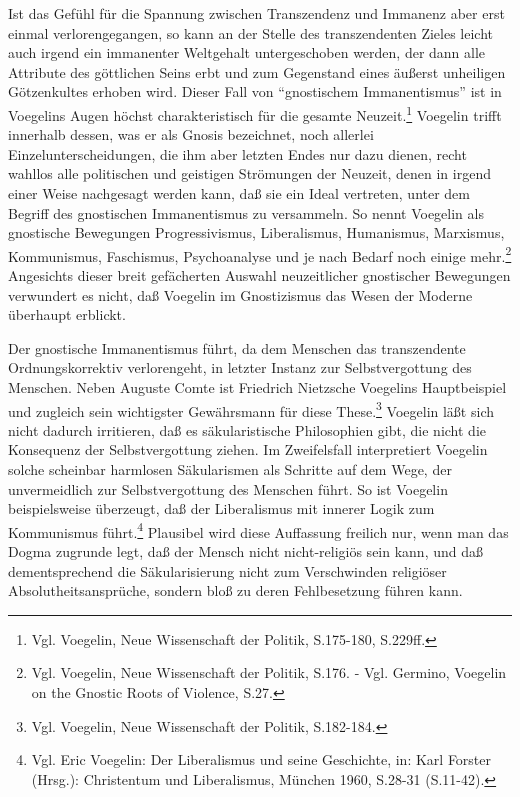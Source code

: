 Ist das Gefühl für die Spannung zwischen Transzendenz und Immanenz aber erst
einmal verlorengegangen, so kann an der Stelle des transzendenten Zieles
leicht auch irgend ein immanenter Weltgehalt untergeschoben werden, der dann
alle Attribute des göttlichen Seins erbt und zum Gegenstand eines äußerst
unheiligen Götzenkultes erhoben wird. Dieser Fall von "`gnostischem
Immanentismus"' ist in Voegelins Augen höchst charakteristisch für die gesamte
Neuzeit.\footnote{Vgl. Voegelin, Neue Wissenschaft der Politik, S.175-180,
  S.229ff.} Voegelin trifft innerhalb dessen, was er als Gnosis bezeichnet,
noch allerlei Einzelunterscheidungen, die ihm aber letzten Endes nur dazu
dienen, recht wahllos alle politischen und geistigen Strömungen der Neuzeit,
denen in irgend einer Weise nachgesagt werden kann, daß sie ein Ideal
vertreten, unter dem Begriff des gnostischen Immanentismus zu versammeln. So
nennt Voegelin als gnostische Bewegungen Progressivismus, Liberalismus,
Humanismus, Marxismus, Kommunismus, Faschismus, Psychoanalyse und je nach
Bedarf noch einige mehr.\footnote{Vgl. Voegelin, Neue Wissenschaft der
  Politik, S.176. - Vgl. Germino, Voegelin on the Gnostic Roots of Violence,
  S.27.} Angesichts dieser breit gefächerten Auswahl neuzeitlicher gnostischer
Bewegungen verwundert es nicht, daß Voegelin im Gnostizismus das Wesen der
Moderne überhaupt erblickt.

Der gnostische Immanentismus führt, da dem Menschen das transzendente
Ordnungskorrektiv verlorengeht, in letzter Instanz zur Selbstvergottung des
Menschen. Neben Auguste Comte ist Friedrich Nietzsche Voegelins Hauptbeispiel
und zugleich sein wichtigster Gewährsmann für diese These.\footnote{Vgl.
  Voegelin, Neue Wissenschaft der Politik, S.182-184.} Voegelin läßt sich
nicht dadurch irritieren, daß es säkularistische Philosophien gibt, die nicht
die Konsequenz der Selbstvergottung ziehen. Im Zweifelsfall interpretiert
Voegelin solche scheinbar harmlosen Säkularismen als Schritte auf dem Wege,
der unvermeidlich zur Selbstvergottung des Menschen führt. So ist Voegelin
beispielsweise überzeugt, daß der Liberalismus mit innerer Logik zum
Kommunismus führt.\footnote{Vgl. Eric Voegelin: Der Liberalismus und seine
  Geschichte, in: Karl Forster (Hrsg.): Christentum und Liberalismus, München
  1960, S.28-31 (S.11-42).} Plausibel wird diese Auf\/fassung freilich nur, wenn
man das Dogma zugrunde legt, daß der Mensch nicht nicht-religiös sein kann,
und daß dementsprechend die Säkularisierung nicht zum Verschwinden religiöser
Absolutheitsansprüche, sondern bloß zu deren Fehlbesetzung führen kann.

